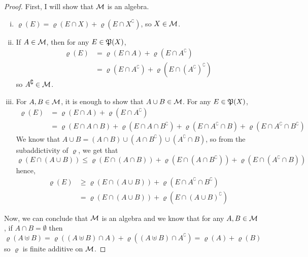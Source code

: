 \begin{proof}
  First, I will show that $\mathcal M$ is an algebra. 
  \begin{enumerate}[(i)]
    \item $\varrho(E) = \varrho(E \cap X) + \varrho(E \cap X^\complement)$, so $X \in \mathcal M$.
    \item If $A \in \mathcal M$, then for any $E \in \mathfrak P(X)$, 
    \begin{align*}
      \varrho(E) &= \varrho(E \cap A) + \varrho(E \cap A^\complement) \\
      &= \varrho(E \cap A^\complement) + \varrho(E \cap (A^\complement)^\complement) 
    \end{align*}
    so $A^\complement \in \mathcal M$.
    \item For $A, B \in \mathcal M$, it is enough to show that $A \cup B \in \mathcal M$.
    For any $E \in \mathfrak P(X)$,
    \begin{align*}
      \varrho(E) &= \varrho(E \cap A) + \varrho(E \cap A^\complement) \\
      &= \varrho(E \cap A \cap B) + \varrho(E \cap A \cap B^\complement) + 
        \varrho(E \cap A^\complement \cap B) + \varrho(E \cap A^\complement \cap B^\complement) 
    \end{align*}
    We know that $A \cup B = (A \cap B) \cup (A \cap B^\complement) \cup (A^\complement \cap B)$, so
    from the subaddictivity of $\varrho$, we get that 
    \[\varrho(E \cap (A \cup B)) \le \varrho(E\cap(A \cap B)) + \varrho(E \cap(A \cap B^\complement)) + \varrho(E \cap (A^\complement \cap B))\]
    hence,
    \begin{align*}
      \varrho(E) &\ge \varrho(E \cap (A \cup B)) + \varrho(E \cap A^\complement \cap B^\complement) \\
      &= \varrho(E \cap (A \cup B)) + \varrho(E \cap (A \cup B)^\complement)
    \end{align*}
  \end{enumerate}
  Now, we can conclude that $\mathcal M$ is an algebra and we know that for any $A, B \in \mathcal M$, if $A \cap B = \emptyset$ then 
  \[\varrho(A \uplus B) = \varrho((A \uplus B) \cap A) + \varrho((A \uplus B) \cap A^\complement) = \varrho(A) + \varrho(B)\]
  so $\varrho$ is finite additive on $\mathcal M$.


\end{proof}
